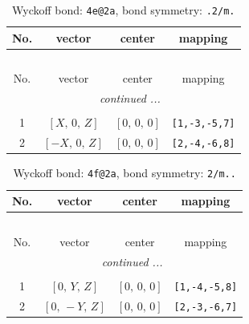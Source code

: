 \documentclass[fleqn,8pt]{jsarticle}
\begin{document}
\begin{longtable}{cccc}
\caption{Wyckoff bond: {\tt 4e@2a}, bond symmetry: {\tt .2/m.}}
 \\
 \hline \hline
No. & vector & center & mapping \\ \hline \endfirsthead

\multicolumn{3}{l}{\tablename\ \thetable{}} \\
 \hline \hline
No. & vector & center & mapping \\ \hline \endhead

 \hline \hline
\multicolumn{3}{r}{\footnotesize\it continued ...} \\ \endfoot

 \hline \hline
\multicolumn{3}{r}{} \\ \endlastfoot

1 & $\left[ X,\, 0,\, Z \right]$ & $\left[ 0,\, 0,\, 0 \right]$ & {\tt [1,-3,-5,7]} \\ \hline
2 & $\left[ - X,\, 0,\, Z \right]$ & $\left[ 0,\, 0,\, 0 \right]$ & {\tt [2,-4,-6,8]} \\
\end{longtable}
\renewcommand{\arraystretch}{1.2}
\begin{longtable}{cccc}
\caption{Wyckoff bond: {\tt 4f@2a}, bond symmetry: {\tt 2/m..}}
 \\
 \hline \hline
No. & vector & center & mapping \\ \hline \endfirsthead

\multicolumn{3}{l}{\tablename\ \thetable{}} \\
 \hline \hline
No. & vector & center & mapping \\ \hline \endhead

 \hline \hline
\multicolumn{3}{r}{\footnotesize\it continued ...} \\ \endfoot

 \hline \hline
\multicolumn{3}{r}{} \\ \endlastfoot

1 & $\left[ 0,\, Y,\, Z \right]$ & $\left[ 0,\, 0,\, 0 \right]$ & {\tt [1,-4,-5,8]} \\ \hline
2 & $\left[ 0,\, - Y,\, Z \right]$ & $\left[ 0,\, 0,\, 0 \right]$ & {\tt [2,-3,-6,7]} \\
\end{longtable}
\renewcommand{\arraystretch}{1.2}
\end{document}
